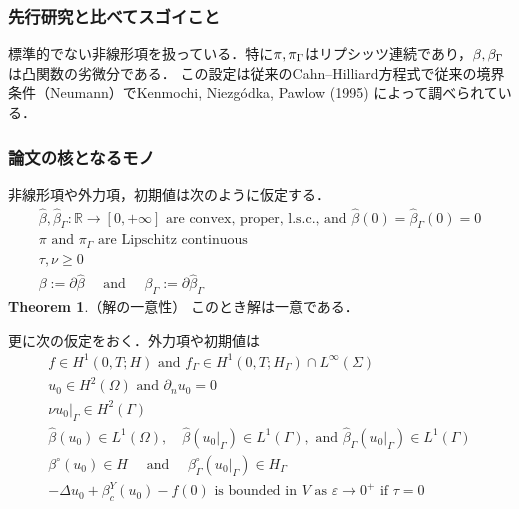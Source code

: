 \documentclass[openary, a4paper, oneside]{jsarticle}
\begin{document}
	\subsubsection{先行研究と比べてスゴイこと}
	標準的でない非線形項を扱っている．特に$\pi, \pi_{\Gamma}$はリプシッツ連続であり，$\beta, \beta_{\Gamma}$は凸関数の劣微分である．
	この設定は従来のCahn--Hilliard方程式で従来の境界条件（Neumann）でKenmochi, Niezg\'odka, Pawlow (1995) \cite{KenmochiNiezgodkaPawlow1995} によって調べられている．
	\subsubsection{論文の核となるモノ}
	非線形項や外力項，初期値は次のように仮定する．
	\begin{equation}\begin{array}{l}
		\widehat{\beta}, \widehat{\beta}_{\Gamma}: \mathbb{R} \rightarrow[0,+\infty]\text{ are convex, proper, l.s.c., and }\widehat{\beta}(0)=\widehat{\beta}_{\Gamma}(0)=0\\
		\pi\text{ and }\pi_{\Gamma}\text{ are Lipschitz continuous}\\
		\tau, \nu \geq 0\\
		\beta:=\partial \widehat{\beta} \quad \text { and } \quad \beta_{\Gamma}:=\partial \widehat{\beta}_{\Gamma}
	\end{array}\end{equation}
	{\bf Theorem 1}.（解の一意性）
	このとき解は一意である．\par
	更に次の仮定をおく．外力項や初期値は
	\begin{align}
		f \in H^{1}(0, T ; H) \text { and } f_{\Gamma} \in H^{1}\left(0, T ; H_{\Gamma}\right) \cap L^{\infty}(\Sigma) \\
		u_{0} \in H^{2}(\Omega) \text { and } \partial_{n} u_{0}=0 \\
		\left.\nu u_{0}\right|_{\Gamma} \in H^{2}(\Gamma) \\
		\widehat{\beta}\left(u_{0}\right) \in L^{1}(\Omega), \quad \widehat{\beta}\left(\left.u_{0}\right|_{\Gamma}\right) \in L^{1}(\Gamma), \text { and } \widehat{\beta}_{\Gamma}\left(\left.u_{0}\right|_{\Gamma}\right) \in L^{1}(\Gamma)\\
		\beta^{\circ}\left(u_{0}\right) \in H \quad \text { and } \quad \beta_{\Gamma}^{\circ}\left(\left.u_{0}\right|_{\Gamma}\right) \in H_{\Gamma}\\
		-\Delta u_{0}+\beta_{c}^{Y}\left(u_{0}\right)-f(0)\text{ is bounded in }V\text{ as }\varepsilon \rightarrow 0^{+}\text{ if }\tau=0
	\end{align}
\end{document}
